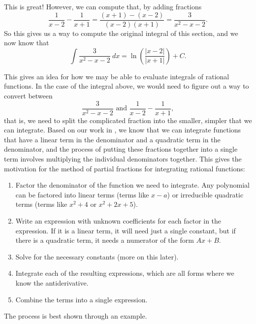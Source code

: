 \documentclass{ximera}
\begin{document}
This is great! However, we can compute that, by adding fractions
\begin{equation*}
    \frac{1}{x-2} - \frac{1}{x+1} = \frac{(x+1)-(x-2)}{(x-2)(x+1)} = \frac{3}{x^2 - x - 2}.
\end{equation*}
So this gives us a way to compute the original integral of this section, and we now know that
\begin{equation*}
    \int \frac{3}{x^2 - x - 2} \ dx = \ln\left(\frac{|x-2|}{|x+1|}\right) + C.
\end{equation*}

This gives an idea for how we may be able to evaluate integrals of rational functions. In the case of the integral above, we would need to figure out a way to convert between
\begin{equation*}
    \frac{3}{x^2 - x - 2} \text{ and } \frac{1}{x-2} - \frac{1}{x+1},
\end{equation*} 
that is, we need to split the complicated fraction into the smaller, simpler  that we can integrate. Based on our work in , we know that we can integrate functions that have a linear term in the denominator and a quadratic term in the denominator, and the process of putting these fractions together into a single term involves multiplying the individual denominators together. This gives the motivation for the method of partial fractions for integrating rational functions:
\begin{enumerate}
    \item Factor the denominator of the function we need to integrate. Any polynomial can be factored into linear terms (terms like $x-a$) or irreducible quadratic terms (terms like $x^2 + 4$ or $x^2 + 2x + 5$).
    \item Write an expression with unknown coefficients for each factor in the expression. If it is a linear term, it will need just a single constant, but if there is a quadratic term, it needs a numerator of the form $Ax + B$. 
    \item Solve for the necessary constants (more on this later).
    \item Integrate each of the resulting expressions, which are all forms where we know the antiderivative.
    \item Combine the terms into a single expression.
\end{enumerate}

The process is best shown through an example.
\end{document}
